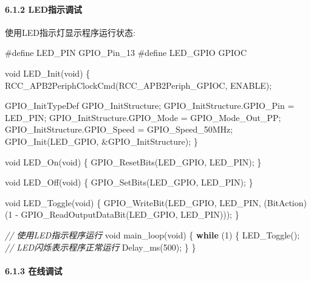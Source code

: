 \documentclass[
]{article}
\newenvironment{Shaded}{}{}
\newcommand{\CommentTok}[1]{\textcolor[rgb]{0.38,0.63,0.69}{\textit{#1}}}
\newcommand{\ControlFlowTok}[1]{\textcolor[rgb]{0.00,0.44,0.13}{\textbf{#1}}}
\newcommand{\DataTypeTok}[1]{\textcolor[rgb]{0.56,0.13,0.00}{#1}}
\newcommand{\DecValTok}[1]{\textcolor[rgb]{0.25,0.63,0.44}{#1}}
\newcommand{\NormalTok}[1]{#1}
\newcommand{\PreprocessorTok}[1]{\textcolor[rgb]{0.74,0.48,0.00}{#1}}
\begin{document}
\hypertarget{ledux6307ux793aux8c03ux8bd5}{%
\paragraph{6.1.2 LED指示调试}\label{ledux6307ux793aux8c03ux8bd5}}

使用LED指示灯显示程序运行状态:

\begin{Shaded}
\begin{Highlighting}[]
\PreprocessorTok{\#define LED\_PIN GPIO\_Pin\_13}
\PreprocessorTok{\#define LED\_GPIO GPIOC}

\DataTypeTok{void}\NormalTok{ LED\_Init(}\DataTypeTok{void}\NormalTok{)}
\NormalTok{\{}
\NormalTok{    RCC\_APB2PeriphClockCmd(RCC\_APB2Periph\_GPIOC, ENABLE);}
    
\NormalTok{    GPIO\_InitTypeDef GPIO\_InitStructure;}
\NormalTok{    GPIO\_InitStructure.GPIO\_Pin = LED\_PIN;}
\NormalTok{    GPIO\_InitStructure.GPIO\_Mode = GPIO\_Mode\_Out\_PP;}
\NormalTok{    GPIO\_InitStructure.GPIO\_Speed = GPIO\_Speed\_50MHz;}
\NormalTok{    GPIO\_Init(LED\_GPIO, \&GPIO\_InitStructure);}
\NormalTok{\}}

\DataTypeTok{void}\NormalTok{ LED\_On(}\DataTypeTok{void}\NormalTok{)}
\NormalTok{\{}
\NormalTok{    GPIO\_ResetBits(LED\_GPIO, LED\_PIN);}
\NormalTok{\}}

\DataTypeTok{void}\NormalTok{ LED\_Off(}\DataTypeTok{void}\NormalTok{)}
\NormalTok{\{}
\NormalTok{    GPIO\_SetBits(LED\_GPIO, LED\_PIN);}
\NormalTok{\}}

\DataTypeTok{void}\NormalTok{ LED\_Toggle(}\DataTypeTok{void}\NormalTok{)}
\NormalTok{\{}
\NormalTok{    GPIO\_WriteBit(LED\_GPIO, LED\_PIN, }
\NormalTok{        (BitAction)(}\DecValTok{1}\NormalTok{ {-} GPIO\_ReadOutputDataBit(LED\_GPIO, LED\_PIN)));}
\NormalTok{\}}

\CommentTok{// 使用LED指示程序运行}
\DataTypeTok{void}\NormalTok{ main\_loop(}\DataTypeTok{void}\NormalTok{)}
\NormalTok{\{}
    \ControlFlowTok{while}\NormalTok{ (}\DecValTok{1}\NormalTok{) \{}
\NormalTok{        LED\_Toggle();  }\CommentTok{// LED闪烁表示程序正常运行}
\NormalTok{        Delay\_ms(}\DecValTok{500}\NormalTok{);}
\NormalTok{    \}}
\NormalTok{\}}
\end{Highlighting}
\end{Shaded}

\hypertarget{ux5728ux7ebfux8c03ux8bd5}{%
\paragraph{6.1.3 在线调试}\label{ux5728ux7ebfux8c03ux8bd5}}
\end{document}
